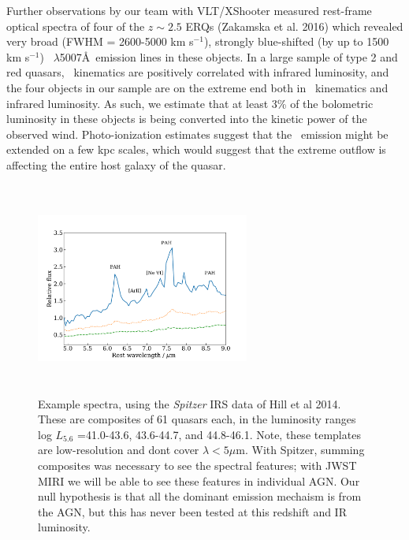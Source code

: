 \smallskip
\smallskip
\noindent
Further observations by our team with VLT/XShooter measured rest-frame
optical spectra of four of the $z\sim 2.5$ ERQs (Zakamska et al. 2016)
which revealed very broad (FWHM = 2600-5000 km s$^{-1}$), strongly
blue-shifted (by up to 1500 km s$^{-1}$) \oiii\ $\lambda$5007\AA\
emission lines in these objects. In a large sample of type 2 and red
quasars, \oiii\ kinematics are positively correlated with infrared
luminosity, and the four objects in our sample are on the extreme end
both in \oiii\ kinematics and infrared luminosity.  As such, we
estimate that at least 3\% of the bolometric luminosity in these
objects is being converted into the kinetic power of the observed
wind. Photo-ionization estimates suggest that the \oiii\ emission
might be extended on a few kpc scales, which would suggest that the
extreme outflow is affecting the entire host galaxy of the quasar.


\begin{figure}
  \centering
    \includegraphics[height=7.0cm,width=7.0cm]{../Figures/Hill2014_IRspectra_Lrange_v1}
\caption{Example spectra, using the {\it Spitzer} IRS data of Hill et al
  2014. These are composites of 61 quasars each, in the luminosity
  ranges log $L_{5.6}$ =41.0-43.6, 43.6-44.7, and 44.8-46.1. Note, these
  templates are low-resolution and dont cover $\lambda<5\mu$m. With
  Spitzer, summing composites was necessary to see the spectral
  features; with JWST MIRI we will be able to see these features in
  individual AGN. Our null hypothesis is that all the dominant emission
  mechaism is from the AGN, but this has never been tested at this
  redshift and IR luminosity.}
  \label{fig:eg_spectra}
\end{figure}


